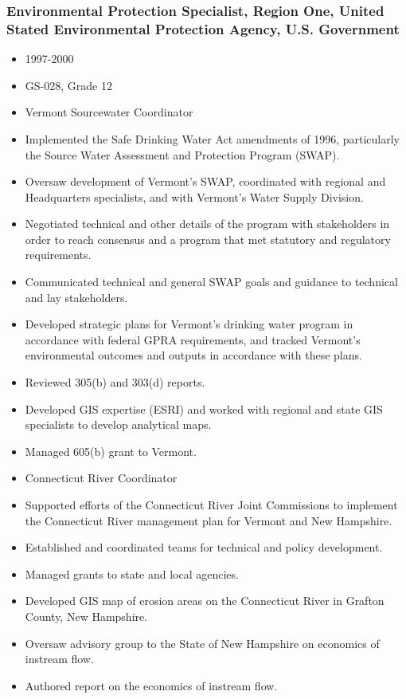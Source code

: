 \documentclass[12pt]{article}
\begin{document}
\subsubsection{Environmental Protection Specialist, Region One, United Stated Environmental Protection Agency, U.S.
Government}

\begin{itemize}
\item
  1997-2000
\item
  GS-028, Grade 12
\item
  Vermont Sourcewater Coordinator
\item
  Implemented the Safe Drinking Water Act amendments of 1996,
  particularly the Source Water Assessment and Protection Program
  (SWAP).
\item
  Oversaw development of Vermont's SWAP, coordinated with regional and
  Headquarters specialists, and with Vermont's Water Supply Division.
\item
  Negotiated technical and other details of the program with
  stakeholders in order to reach consensus and a program that met
  statutory and regulatory requirements.
\item
  Communicated technical and general SWAP goals and guidance to
  technical and lay stakeholders.
\item
  Developed strategic plans for Vermont's drinking water program in
  accordance with federal GPRA requirements, and tracked Vermont's
  environmental outcomes and outputs in accordance with these plans.
\item
  Reviewed 305(b) and 303(d) reports.
\item
  Developed GIS expertise (ESRI) and worked with regional and state GIS
  specialists to develop analytical maps.
\item
  Managed 605(b) grant to Vermont.
\item
  Connecticut River Coordinator
\item
  Supported efforts of the Connecticut River Joint Commissions to
  implement the Connecticut River management plan for Vermont and New
  Hampshire.
\item
  Established and coordinated teams for technical and policy
  development.
\item
  Managed grants to state and local agencies.
\item
  Developed GIS map of erosion areas on the Connecticut River in Grafton
  County, New Hampshire.
\item
  Oversaw advisory group to the State of New Hampshire on economics of
  instream flow.
\item
  Authored report on the economics of instream flow.
\end{itemize}
\end{document}
